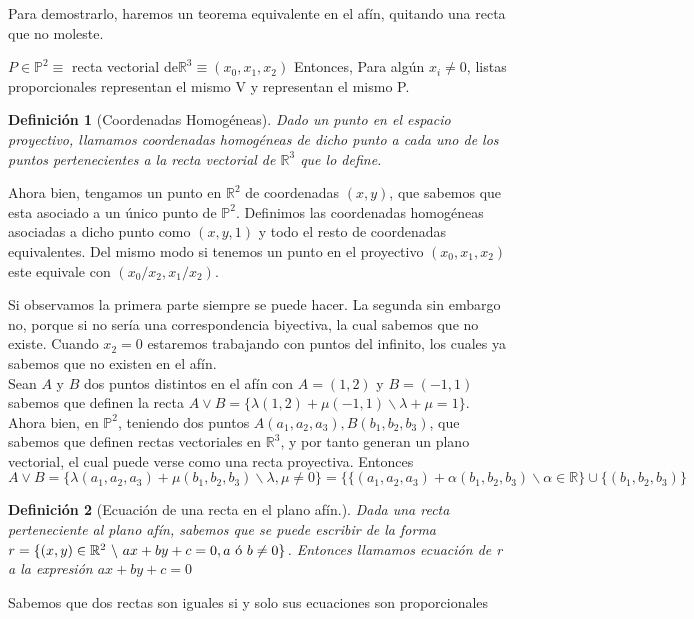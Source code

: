 \documentclass[11pt, a4paper]{article}
\makeatletter
\newif\IfInSansMode
\let\oldsf\sffamily
\renewcommand*{\sffamily}{\oldsf\mathversion{sans}\InSansModetrue}
\let\oldnorm\normalfont
\renewcommand*{\normalfont}{\oldnorm\InSansModefalse\mathversion{normal}}
\renewenvironment{proof}[1][\proofname] {\vspace{-15pt}\par\pushQED{\qed}\normalfont\topsep6\p@\@plus6\p@\relax\trivlist\item[\hskip\labelsep\it#1\@addpunct{.}]\ignorespaces}{\popQED\endtrivlist\@endpefalse}
\renewenvironment{proof}[1][\proofname] {\par\pushQED{\qed}\normalfont\topsep6\p@\@plus6\p@\relax\trivlist\item[\hskip\labelsep\itshape\sffamily#1\@addpunct{.}]\ignorespaces}{\popQED\endtrivlist\@endpefalse}
\theoremstyle{theorem-style}
\theoremstyle{definition-style}
\newtheorem{ndef}{Definición}[section]
\theoremstyle{remark-style}
\theoremstyle{example-style}
\makeatother
\begin{document}
\begin{proof}
	Para demostrarlo, haremos un teorema equivalente en el afín, quitando una recta que no moleste.
\end{proof}

	$P \in \mathbb{P}^2 \equiv$ recta vectorial de$ \mathbb{R}^3 \equiv (x_0,x_1,x_2) $
	Entonces, Para algún $x_i \ne 0$, listas proporcionales representan el mismo V y representan el mismo P.

\begin{ndef}[Coordenadas Homogéneas]
Dado un punto en el espacio proyectivo, llamamos coordenadas homogéneas de dicho punto a cada uno de los puntos pertenecientes a la recta vectorial de $\mathbb{R}^3$ que lo define.
\end{ndef}


Ahora bien, tengamos un punto en $\mathbb{R}^2$ de coordenadas $(x,y)$, que sabemos que esta asociado a un único punto de $\mathbb{P}^2$. Definimos las coordenadas homogéneas asociadas a dicho punto como $(x,y,1)$ y todo el resto de coordenadas equivalentes. Del mismo modo si tenemos un punto en el proyectivo  $(x_0, x_1, x_2)$ este equivale con $(x_0/x_2, x_1/x_2)$. 

Si observamos la primera parte siempre se puede hacer. La segunda sin embargo no, porque si no sería una correspondencia biyectiva, la cual sabemos que no existe. Cuando $x_2 = 0$ estaremos trabajando con puntos del infinito, los cuales ya sabemos que no existen en el afín.\\

Sean $A$ y $B$ dos puntos distintos en el afín con $A =(1,2)$ y $B=(-1,1)$ sabemos que definen la recta $A \vee B = \{ \lambda (1,2) + \mu (-1,1) \backslash \lambda + \mu = 1\}$.\\
Ahora bien, en $\mathbb{P}^2$, teniendo dos puntos $A(a_1,a_2,a_3), B(b_1,b_2,b_3)$, que sabemos que definen rectas vectoriales en $\mathbb{R}^3$, y por tanto generan un plano vectorial, el cual puede verse como una recta proyectiva. Entonces $A\vee B = \{ \lambda (a_1,a_2,a_3) + \mu (b_1,b_2,b_3)\backslash \lambda, \mu \ne 0 \} = \{  \{ (a_1,a_2,a_3) + \alpha (b_1,b_2,b_3)\backslash \alpha  \in \mathbb{R}\} \cup  \{(b_1,b_2,b_3) \}$
\begin{ndef}[Ecuación de una recta en el plano afín.]
Dada una recta perteneciente al plano afín, sabemos que se puede escribir de la forma $r = \{(x,y) \in \mathbb{R}^2\ \backslash\ ax + by + c = 0, a \textup{ ó } b \neq 0\}$. Entonces llamamos ecuación de r a la expresión $ax + by + c = 0$ 
\end{ndef}
Sabemos que dos rectas son iguales si y solo sus ecuaciones son proporcionales
\end{document}
